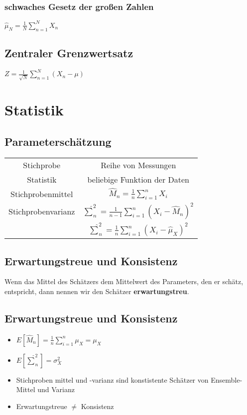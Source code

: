 \documentclass{article}
\begin{document}
\subsubsection{schwaches Gesetz der gro\ss en Zahlen}
$\hat{\mu}_N = \frac{1}{N} \sum_{n = 1}^N X_n$
\subsection{Zentraler Grenzwertsatz}
$Z = \frac{1}{\sqrt{N}}\sum_{n = 1}^N(X_n -\mu)$

\section {Statistik}
\subsection{Parameterschätzung}
\begin{tabular}{c c }
Stichprobe& Reihe von Messungen \\
Statistik & beliebige Funktion der Daten \\
Stichprobenmittel & $\hat{M}_n = \frac{1}{n} \sum_{i=1}^n X_i$\\
Stichprobenvarianz & $\hat{\sum}_n^2 = \frac{1}{n-1} \sum_{i = 1}^n(X_i-\hat{M}_n)^2$ \\
		& $\hat{\sum}_n^2 = \frac{1}{n} \sum_{i = 1}^n(X_i-\hat{\mu}_X)^2$
\end{tabular}
\subsection{Erwartungstreue und Konsistenz}
Wenn das Mittel des Schätzers dem Mittelwert des Parameters, den er schätz, entspricht, dann nennen wir den Schätzer \textbf{ erwartungstreu}.



\subsection{Erwartungstreue und Konsistenz}
\begin{itemize}
\item $ E[\hat{M}_n] = \frac{1}{n} \sum_{i=1}^n \mu_X = \mu_X$
\item $E[\hat{\sum}_n^2] = \sigma_X^2$
\item Stichproben mittel und -varianz sind konstistente Schätzer von Ensemble-Mittel und Varianz
\item Erwartungstreue $\neq$ Konsistenz
\end{itemize}
\end{document}
